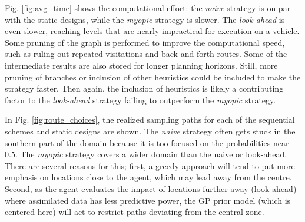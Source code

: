 \documentclass[aoas]{imsart}
\begin{document}
Fig.  \ref{fig:avg_time} shows the computational effort: the \textit{naive} strategy is on par with the static designs, while the \textit{myopic} strategy is slower. The \textit{look-ahead} is even slower, reaching levels that are nearly impractical for execution on a vehicle. Some pruning of the graph is performed to improve the computational speed, such as ruling out repeated visitations and back-and-forth routes. Some of the intermediate results are also stored for longer planning horizons. Still, more pruning of branches or inclusion of other heuristics could be included to make the strategy faster. Then again, the inclusion of heuristics is likely a contributing factor to the \textit{look-ahead} strategy failing to outperform the \textit{myopic} strategy. 

In Fig. \ref{fig:route_choices}, the realized sampling paths for each of the sequential schemes and static designs are shown. The \textit{naive} strategy often gets stuck in the southern part of the domain because it is too focused on the probabilities near $0.5$. The \textit{myopic} strategy covers a wider domain than the naive or look-ahead. There are several reasons for this; first, a greedy approach will tend to put more emphasis on locations close to the agent, which may lead away from the centre. Second, as the agent evaluates the impact of locations further away (look-ahead) where assimilated data has less predictive power, the GP prior model (which is centered here) will act to restrict paths deviating from the central zone.   

\end{document}
